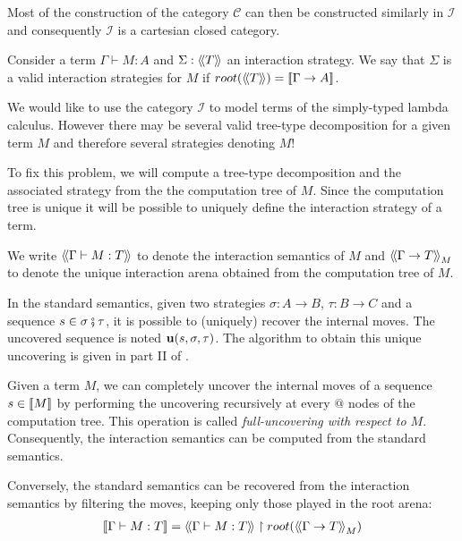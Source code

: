 Most of the construction of the category $\mathcal{C}$ can then be constructed similarly in $\mathcal{I}$ and consequently
$\mathcal{I}$ is a cartesian closed category.


\begin{dfn}
Consider a term $\Gamma \vdash M : A$ and $\Sigma : {\langle\!\langle T \rangle\!\rangle}$ an interaction strategy.
We say that $\Sigma$ is a valid interaction strategies for $M$ if $root({\langle\!\langle T \rangle\!\rangle}) = {[\![ \Gamma \rightarrow A ]\!]}$.
\end{dfn}

We would like to use the category $\mathcal{I}$ to model terms of the
simply-typed lambda calculus. However there may be several valid tree-type decomposition for a given term $M$ and therefore
several strategies denoting $M$!

To fix this problem, we will compute a tree-type decomposition and the associated strategy from the
the computation tree of $M$. Since the computation tree is unique it will be possible to uniquely define
the interaction strategy of a term.






We write ${\langle\!\langle \Gamma \vdash M : T \rangle\!\rangle}$ to denote the interaction semantics of $M$ and ${\langle\!\langle \Gamma \rightarrow T \rangle\!\rangle}_M$
to denote the unique interaction arena obtained from the computation tree of $M$.


In the standard semantics, given two strategies $\sigma : A \rightarrow B$, $\tau : B \rightarrow C$ and
a sequence $s \in \sigma \fatsemi \tau$, it is possible to (uniquely) recover the internal moves. The uncovered sequence is noted
 ${\bf u}(s, \sigma, \tau)$. The algorithm to obtain this unique uncovering is given in part II of \cite{hylandong_pcf}.

Given a term $M$, we can completely uncover the internal moves of a sequence $s\in{[\![M ]\!]}$
by performing the uncovering recursively at every $@$ nodes of the computation tree.
This operation is called \emph{full-uncovering with respect to $M$}.
Consequently, the interaction semantics can be computed from the standard semantics.

Conversely, the standard semantics can be recovered from the interaction semantics by filtering the moves, keeping only those played
in the root arena:
\begin{eqnarray}
 {[\![\Gamma \vdash M : T ]\!]} = {\langle\!\langle \Gamma \vdash M : T \rangle\!\rangle} \upharpoonright root({\langle\!\langle \Gamma \rightarrow T \rangle\!\rangle}_M) \label{eqn:int_std_gamsem}
\end{eqnarray}

